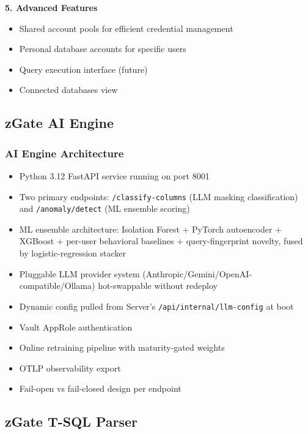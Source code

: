 \textbf{5. Advanced Features}
\begin{itemize}
    \item Shared account pools for efficient credential management
    \item Personal database accounts for specific users
    \item Query execution interface (future)
    \item Connected databases view
\end{itemize}

\subsection{zGate AI Engine}

\subsubsection{AI Engine Architecture}
\begin{itemize}
    \item Python 3.12 FastAPI service running on port 8001
    \item Two primary endpoints: \texttt{/classify-columns} (LLM masking classification) and \texttt{/anomaly/detect} (ML ensemble scoring)
    \item ML ensemble architecture: Isolation Forest + PyTorch autoencoder + XGBoost + per-user behavioral baselines + query-fingerprint novelty, fused by logistic-regression stacker
    \item Pluggable LLM provider system (Anthropic/Gemini/OpenAI-compatible/Ollama) hot-swappable without redeploy
    \item Dynamic config pulled from Server's \texttt{/api/internal/llm-config} at boot
    \item Vault AppRole authentication
    \item Online retraining pipeline with maturity-gated weights
    \item OTLP observability export
    \item Fail-open vs fail-closed design per endpoint
\end{itemize}

\subsection{zGate T-SQL Parser}


